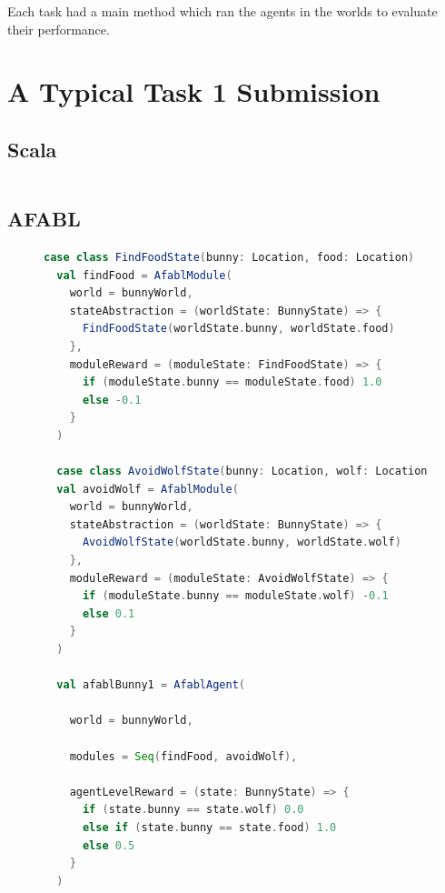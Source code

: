 Each task had a main method which ran the agents in the worlds to evaluate their performance.

\section{A Typical Task 1 Submission}

\subsection{Scala}

\begin{figure}[h]
\begin{center}

\begin{lstlisting}[language=Scala]

\end{lstlisting}

\caption{}
\end{center}
\label{fig:scala-task1-submission}
\end{figure}


\subsection{AFABL}

\begin{figure}[h]
\begin{center}

\begin{lstlisting}[language=Scala]
  case class FindFoodState(bunny: Location, food: Location)
  val findFood = AfablModule(
    world = bunnyWorld,
    stateAbstraction = (worldState: BunnyState) => {
      FindFoodState(worldState.bunny, worldState.food)
    },
    moduleReward = (moduleState: FindFoodState) => {
      if (moduleState.bunny == moduleState.food) 1.0
      else -0.1
    }
  )

  case class AvoidWolfState(bunny: Location, wolf: Location)
  val avoidWolf = AfablModule(
    world = bunnyWorld,
    stateAbstraction = (worldState: BunnyState) => {
      AvoidWolfState(worldState.bunny, worldState.wolf)
    },
    moduleReward = (moduleState: AvoidWolfState) => {
      if (moduleState.bunny == moduleState.wolf) -0.1
      else 0.1
    }
  )

  val afablBunny1 = AfablAgent(

    world = bunnyWorld,

    modules = Seq(findFood, avoidWolf),

    agentLevelReward = (state: BunnyState) => {
      if (state.bunny == state.wolf) 0.0
      else if (state.bunny == state.food) 1.0
      else 0.5
    }
  )
\end{lstlisting}

\caption{}
\end{center}
\label{fig:afabl-task1-submission}
\end{figure}


